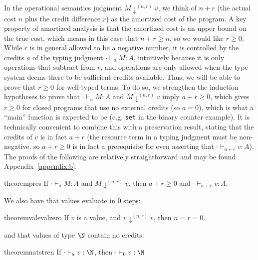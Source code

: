 In the operational semantics judgment $M \downarrow^{(n,r)} v$, we
think of $n + r$ (the actual cost $n$ plus the credit difference $r$) as
the amortized cost of the program.  A key property of amortized analysis
is that the amortized cost is an upper bound on the true cost, which
means in this case that $n + r \ge n$, so we would like $r \ge 0$.
While $r$ is in general allowed to be a negative number, it is
controlled by the credits $a$ of the typing judgment $\cdot \vdash_a M
: A$, intuitively because it is only \discname\/ operations that
subtract from $r$, and \discname\/ operations are only allowed when the
type system deems there to be sufficient credits available.  Thus, we
will be able to prove that $r \ge 0$ for well-typed terms.  To do so,
we strengthen the induction hypotheses to prove that $\cdot \vdash_a M :
A$ and $M \downarrow^{(n,r)} v$ imply $a + r \geq 0$, which gives $r
\geq 0$ for closed programs that use no external credits (so $a = 0$),
which is what a ``main'' function is expected to be (e.g. \texttt{set}
in the binary counter example).  It is technically convenient to combine
this with a preservation result, stating that the credits of $v$ is in
fact $a + r$ (the resource term in a typing judgment must be
non-negative, so $a + r \geq 0$ is in fact a prerequisite for even
asserting that $\cdot \vdash_{a+r} v : A$).  The proofs of the following are
relatively straightforward and may be found
Appendix~\ref{appendix:b}.%


\begin{restatable}{theorem}{pres}
\label{thm:pres}
If $\cdot \vdash_a M : A$ and $M \downarrow^{(n,r)} v$, then $a + r \geq 0$ and $\cdot \vdash_{a + r} v : A$. 
\end{restatable}

We also have that values evaluate in 0 steps:
\begin{restatable}[]{theorem}{valevalzero}\label{thm:val-eval-none}
If $v$ is a value, and $v \downarrow^{(n,r)} v$, then $n = r = 0$.
\end{restatable}

and that values of type $\N$ contain no credits:
\begin{restatable}{theorem}{natstren}\label{thm:nat-strengthening}
If $\cdot \vdash_a v : \N$, then $\cdot \vdash_0 v : \N$
\end{restatable}



